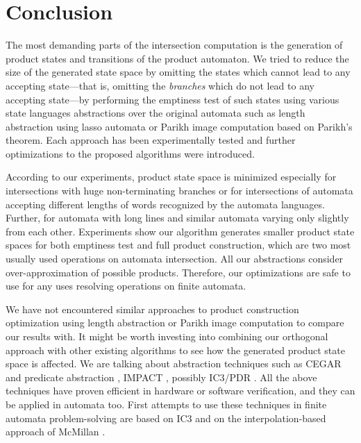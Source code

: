 \chapter{Conclusion}

The most demanding parts of the intersection computation is the generation of product states and transitions of the product automaton. We tried to reduce the size of the generated state space by omitting the states which cannot lead to any accepting state---that is, omitting the \textit{branches} which do not lead to any accepting state---by performing the emptiness test of such states using various state languages abstractions over the original automata such as length abstraction using lasso automata or Parikh image computation based on Parikh's theorem. Each approach has been experimentally tested and further optimizations to the proposed algorithms were introduced.

According to our experiments, product state space is minimized especially for intersections with huge non-terminating branches or for intersections of automata accepting different lengths of words recognized by the automata languages. Further, for automata with long lines and similar automata varying only slightly from each other. Experiments show our algorithm generates smaller product state spaces for both emptiness test and full product construction, which are two most usually used operations on automata intersection. All our abstractions consider over-approximation of possible products. Therefore, our optimizations are safe to use for any uses resolving operations on finite automata.

We have not encountered similar approaches to product construction optimization using length abstraction or Parikh image computation to compare our results with. It might be worth investing into combining our orthogonal approach with other existing algorithms to see how the generated product state space is affected. We are talking about abstraction techniques such as CEGAR \cite{DBLP:conf/cav/ClarkeGJLV00} and predicate abstraction \cite{DBLP:conf/cav/ColonU98, DBLP:conf/cav/GrafS97}, IMPACT \cite{DBLP:conf/cav/McMillan06}, possibly IC3/PDR \cite{DBLP:conf/sat/HoderB12, DBLP:conf/fmcad/BradleyM07}. All the above techniques have proven efficient in hardware or software verification, and they can be applied in automata too. First attempts to use these techniques in finite automata problem-solving are based on IC3 \cite{DBLP:journals/pacmpl/HolikJLRV18, DBLP:conf/cav/WangTLYJ16, DBLP:journals/corr/abs-1708-09073} and on the interpolation-based approach of McMillan \cite{DBLP:conf/tacas/AmlaM07, DBLP:conf/tacas/GangeNSSS13}.
